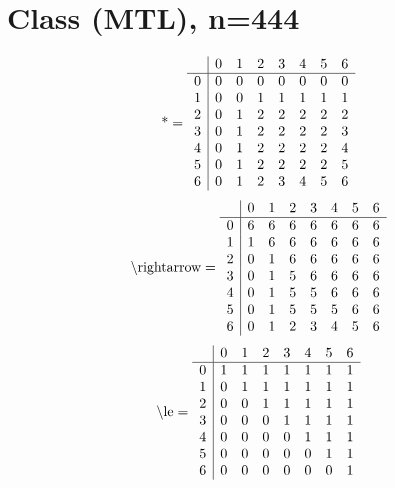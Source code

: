 \documentclass[11pt]{article}
\begin{document}
\section{Class (MTL), n=444}
\[\text{*} = 
\begin{array}{r | r r r r r r r}
 & 0 & 1 & 2 & 3 & 4 & 5 & 6 \\ \hline
0 & 0 & 0 & 0 & 0 & 0 & 0 & 0 \\
1 & 0 & 0 & 1 & 1 & 1 & 1 & 1 \\
2 & 0 & 1 & 2 & 2 & 2 & 2 & 2 \\
3 & 0 & 1 & 2 & 2 & 2 & 2 & 3 \\
4 & 0 & 1 & 2 & 2 & 2 & 2 & 4 \\
5 & 0 & 1 & 2 & 2 & 2 & 2 & 5 \\
6 & 0 & 1 & 2 & 3 & 4 & 5 & 6 \\
\end{array}
\]
\[\text{\textbackslash rightarrow} = 
\begin{array}{r | r r r r r r r}
 & 0 & 1 & 2 & 3 & 4 & 5 & 6 \\ \hline
0 & 6 & 6 & 6 & 6 & 6 & 6 & 6 \\
1 & 1 & 6 & 6 & 6 & 6 & 6 & 6 \\
2 & 0 & 1 & 6 & 6 & 6 & 6 & 6 \\
3 & 0 & 1 & 5 & 6 & 6 & 6 & 6 \\
4 & 0 & 1 & 5 & 5 & 6 & 6 & 6 \\
5 & 0 & 1 & 5 & 5 & 5 & 6 & 6 \\
6 & 0 & 1 & 2 & 3 & 4 & 5 & 6 \\
\end{array}
\]
\[\text{\textbackslash le} = 
\begin{array}{r | r r r r r r r}
 & 0 & 1 & 2 & 3 & 4 & 5 & 6 \\ \hline
0 & 1 & 1 & 1 & 1 & 1 & 1 & 1 \\
1 & 0 & 1 & 1 & 1 & 1 & 1 & 1 \\
2 & 0 & 0 & 1 & 1 & 1 & 1 & 1 \\
3 & 0 & 0 & 0 & 1 & 1 & 1 & 1 \\
4 & 0 & 0 & 0 & 0 & 1 & 1 & 1 \\
5 & 0 & 0 & 0 & 0 & 0 & 1 & 1 \\
6 & 0 & 0 & 0 & 0 & 0 & 0 & 1 \\
\end{array}
\]
\end{document}
